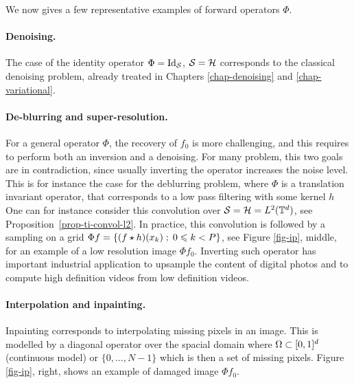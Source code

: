We now gives a few representative examples of forward operators $\Phi$.

\paragraph{Denoising.}

The case of the identity operator $\Phi=\mathrm{Id}_{\mathcal{S}}$, $\mathcal{S}=\mathcal{H}$ corresponds to the classical denoising problem, already treated in Chapters \ref{chap-denoising} and \ref{chap-variational}. 

\paragraph{De-blurring and super-resolution.}

For a general operator $\Phi$, the recovery of $f_0$ is more challenging, and this requires to perform both an inversion and a denoising. For many problem, this two goals are in contradiction, since usually inverting the operator increases the noise level.
%
This is for instance the case for the deblurring problem, where $\Phi$ is a translation invariant operator, that corresponds to a low pass filtering with some kernel $h$
One can for instance consider this convolution over $\mathcal{S}=\mathcal{H}=L^2(\mathbb{T}^d)$, see Proposition~\ref{prop-ti-convol-l2}. 
%
In practice, this convolution is followed by a sampling on a grid $\Phi f = \left\{ (f \star h)(x_k) \;;\; 0 \leqslant k< P \right\}$, see Figure \ref{fig-ip}, middle, for an example of a low resolution image $\Phi f_0$.
%
Inverting such operator has important industrial application to upsample the content of digital photos and to compute high definition videos from low definition videos.


\paragraph{Interpolation and inpainting.}

Inpainting corresponds to interpolating missing pixels in an image. This is modelled by a diagonal operator over the spacial domain
where $\Omega \subset [0,1]^d$ (continuous model) or $\{0,\ldots,N-1\}$ which is then a set of missing pixels.
%
Figure \ref{fig-ip}, right, shows an example of damaged image $\Phi f_0$.



